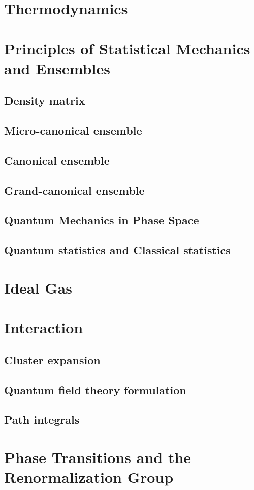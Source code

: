 \chapter{Thermodynamics}

\chapter{Principles of Statistical Mechanics and Ensembles}
\section{Density matrix}
\section{Micro-canonical ensemble}
\section{Canonical ensemble}
\section{Grand-canonical ensemble}
\section{Quantum Mechanics in Phase Space}
\section{Quantum statistics and Classical statistics}

\chapter{Ideal Gas}

\chapter{Interaction}
\section{Cluster expansion}
\section{Quantum field theory formulation}
\section{Path integrals}

\chapter{Phase Transitions and the Renormalization Group}